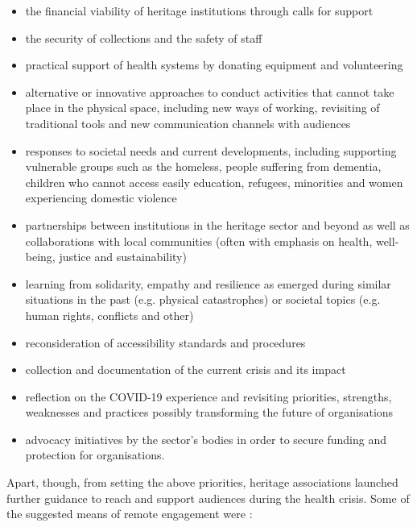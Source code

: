 \documentclass{egpubl}
\begin{document}
\begin{itemize}
\item the financial viability of heritage institutions through calls for support
\item the security of collections and the safety of staff
\item practical support of health systems by donating equipment and volunteering 
\item alternative or innovative approaches to conduct activities that cannot take place in the physical space, including new ways of working, revisiting of traditional tools and new communication channels with audiences
\item responses to societal needs and current developments, including supporting vulnerable groups such as the homeless, people suffering from dementia, children who cannot access easily education, refugees, minorities and women experiencing domestic violence
\item partnerships between institutions in the heritage sector and beyond as well as collaborations with local communities (often with emphasis on health, well-being, justice and sustainability)
\item learning from solidarity, empathy and resilience as emerged during similar situations in the past (e.g. physical catastrophes) or societal topics (e.g. human rights, conflicts and other)
\item reconsideration of accessibility standards and procedures
\item collection and documentation of the current crisis and its impact
\item reflection on the COVID-19 experience and revisiting priorities, strengths, weaknesses and practices possibly transforming the future of organisations
\item advocacy initiatives by the sector's bodies in order to secure funding and protection for organisations.
\end{itemize}

Apart, though, from setting the above priorities, heritage associations launched further guidance to reach and support audiences during the health crisis. Some of the suggested means of remote engagement were \cite{InternationalCouncilofMuseums2020,Ciecko2020,NetworkofEuropeanMuseumOrganisations20201}:
\end{document}
